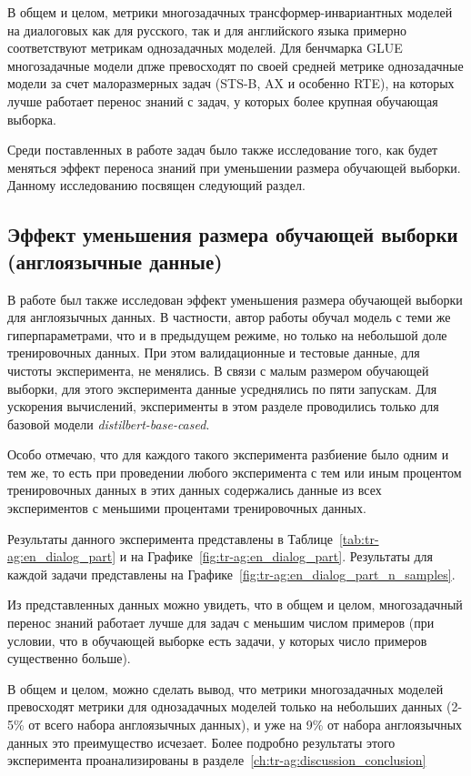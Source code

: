 В общем и целом, метрики многозадачных трансформер-инвариантных моделей на диалоговых как для русского, так и для английского языка примерно соответствуют метрикам однозадачных моделей.
 Для бенчмарка GLUE многозадачные модели дпже превосходят по своей средней метрике однозадачные модели за счет малоразмерных задач (STS-B, AX и особенно RTE), на которых лучше работает перенос знаний с задач, у которых более крупная обучающая выборка. 

Среди поставленных в работе задач было также исследование того, как будет меняться эффект переноса знаний при уменьшении размера обучающей выборки. Данному исследованию посвящен следующий раздел. 

\subsection{Эффект уменьшения размера обучающей выборки (англоязычные данные)}
В работе был также исследован эффект уменьшения размера обучающей выборки для англоязычных данных. В частности, автор работы обучал модель с теми же гиперпараметрами, что и в предыдущем режиме, но только на небольшой доле тренировочных данных. При этом валидационные и тестовые данные, для чистоты эксперимента, не менялись. В связи с малым размером обучающей выборки, для этого эксперимента данные усреднялись по пяти запускам. Для ускорения вычислений, эксперименты в этом разделе проводились только для базовой модели \textit{distilbert-base-cased}. 

Особо отмечаю, что для каждого такого эксперимента разбиение было одним и тем же, то есть при проведении любого эксперимента с тем или иным процентом тренировочных данных в этих данных содержались данные из всех экспериментов с меньшими процентами тренировочных данных. 

Результаты данного эксперимента представлены в Таблице~\ref{tab:tr-ag:en_dialog_part} и на Графике~\ref{fig:tr-ag:en_dialog_part}. Результаты для каждой задачи представлены на Графике~\ref{fig:tr-ag:en_dialog_part_n_samples}. %

Из представленных данных можно увидеть, что в общем и целом, многозадачный перенос знаний работает лучше для задач с меньшим числом примеров (при условии, что в обучающей выборке есть задачи, у которых число примеров существенно больше). 

В общем и целом, можно сделать вывод, что метрики многозадачных моделей превосходят метрики для однозадачных моделей только на небольших данных (2-5\% от всего набора англоязычных данных), и уже на 9\% от набора англоязычных данных это преимущество исчезает. Более подробно результаты этого эксперимента проанализированы в разделе~\ref{ch:tr-ag:discussion_conclusion}

